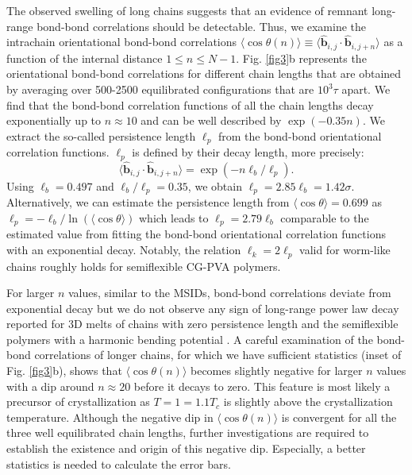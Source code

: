 \documentclass[pre,showpacs,notitlepage,twocolumn]{revtex4-1}
\begin{document}
 The observed  swelling of long chains suggests that  an evidence of remnant long-range  bond-bond correlations should be detectable. Thus, we  examine the intrachain  orientational bond-bond correlations  
$ \langle \cos \theta  (n) \rangle \equiv \langle \widehat{\mathbf{b}}_{i,j} \cdot \widehat{\mathbf{b}}_{i,j+n}  \rangle $  as a 
 function of the internal distance $1 \le n \le N-1$.  Fig. \ref{fig3}b represents the orientational bond-bond correlations for different chain lengths that are obtained by averaging over 500-2500 equilibrated configurations that are $10^3 \tau$ apart.  
 We find that the   bond-bond correlation functions of all the chain lengths decay exponentially up to $n \approx  10$  and  can be
well described by $\exp(-0.35 n)$.  We   extract the so-called persistence length $\ell_p$ from the bond-bond orientational correlation functions.  $\ell_p$ 
is defined by their decay length, more precisely:
\begin{equation}
  \langle \widehat{\mathbf{b}}_{i,j} \cdot \widehat{\mathbf{b}}_{i,j+n}  \rangle= \exp(-n \ell_b/\ell_p).
  \end{equation}
 Using $\ell_b=0.497$ and $\ell_b/\ell_p=0.35$, we obtain $\ell_p=2.85 \ell_b=1.42 \sigma$.  Alternatively, we can estimate the persistence length from  $ \langle \cos \theta \rangle=0.699 $ 
  as $\ell_p=-\ell_b/\ln ( \langle \cos \theta \rangle)$ which leads to $\ell_p=2.79 \ell_b$  comparable to the estimated value from fitting the bond-bond orientational correlation functions with an exponential
  decay.  Notably,  the relation $\ell_k =2\ell_p$ valid for worm-like chains roughly holds  for semiflexible CG-PVA polymers.
  
 For larger $n$ values, similar to the MSIDs,  bond-bond correlations  deviate from exponential decay but we do not observe any sign of long-range power law decay reported for 3D melts
 of  chains with zero persistence length \cite{Wittmer2004}  and the semiflexible  polymers with a harmonic bending potential \cite{Hsu2014}. 
 A careful examination of  the bond-bond correlations of longer chains,  for which we have sufficient statistics
 (inset of  Fig. \ref{fig3}b),  shows  that $\langle  \cos \theta (n)\rangle$ becomes slightly negative for larger $n$ values with a dip around $n \approx 20$ before it decays to zero. This feature  is most likely a precursor of crystallization as
 $T=1=1.1T_c$ is slightly above the crystallization temperature. Although the negative dip in $\langle  \cos \theta (n)\rangle$ is convergent for all the three well equilibrated chain lengths,  further investigations are required to establish the existence and origin of this negative dip.  Especially, a better statistics is needed  to calculate the error bars. 
 
\end{document}
